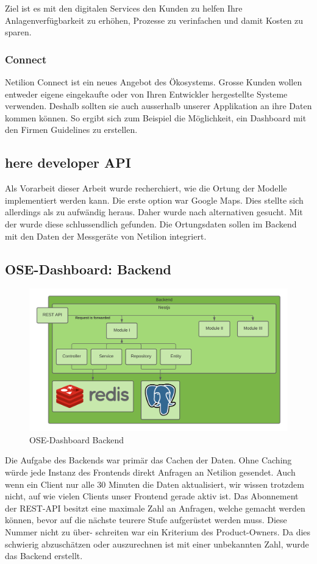 Ziel ist es mit den digitalen Services den Kunden zu helfen Ihre Anlagenverfügbarkeit zu erhöhen, Prozesse zu verinfachen und damit Kosten zu sparen.
\subsubsection{Connect}
Netilion Connect ist ein neues Angebot des Ökosystems. Grosse Kunden wollen entweder eigene eingekaufte oder von Ihren Entwickler hergestellte Systeme verwenden. Deshalb sollten sie auch ausserhalb unserer Applikation an ihre Daten kommen können. So ergibt sich zum Beispiel die Möglichkeit, ein Dashboard mit den Firmen Guidelines zu erstellen.
\subsection{here developer API}
Als Vorarbeit dieser Arbeit wurde recherchiert, wie die Ortung der Modelle implementiert werden kann. Die erste option war Google Maps. Dies stellte sich allerdings als zu aufwändig heraus. Daher wurde nach alternativen gesucht. Mit der  wurde diese schlussendlich gefunden.
\newline
Die Ortungsdaten sollen im Backend mit den Daten der Messgeräte von Netilion integriert.
\subsection{OSE-Dashboard: Backend} \label{arch-backend}
\begin{figure}[H]
  \centering
  \includegraphics[width=.95\linewidth]{./images/backend.png}
  \caption[{Diagramm OSE-Dashboard Backend von Jonas Schultheiss}]{OSE-Dashboard Backend}
  \label{fig:backend}
\end{figure}
Die Aufgabe des Backends war primär das Cachen der Daten. Ohne Caching würde jede Instanz des Frontends direkt Anfragen an Netilion gesendet. Auch wenn ein Client nur alle 30 Minuten die Daten aktualisiert, wir wissen trotzdem nicht, auf wie vielen Clients unser Frontend gerade aktiv ist. Das Abonnement der REST-API besitzt eine maximale Zahl an Anfragen, welche gemacht werden können, bevor auf die nächste teurere Stufe aufgerüstet werden muss. Diese Nummer nicht zu über- schreiten war ein Kriterium des Product-Owners. Da dies schwierig abzuschätzen oder auszurechnen ist mit einer unbekannten Zahl, wurde das Backend erstellt.


